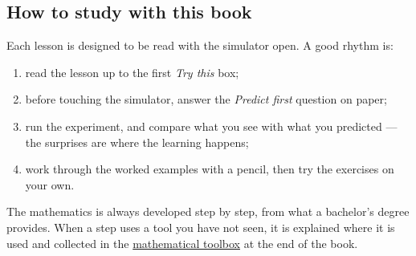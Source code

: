 \subsection{How to study with this book}
Each lesson is designed to be read with the simulator open. A good rhythm is:
\begin{enumerate}
  \item read the lesson up to the first \emph{Try this} box;
  \item before touching the simulator, answer the \emph{Predict first} question on paper;
  \item run the experiment, and compare what you see with what you predicted — the surprises are where the learning happens;
  \item work through the worked examples with a pencil, then try the exercises on your own.
\end{enumerate}
The mathematics is always developed step by step, from what a bachelor's degree provides. When a step uses a tool you have not seen, it is explained where it is used and collected in the \hyperref[app:math]{mathematical toolbox} at the end of the book.
